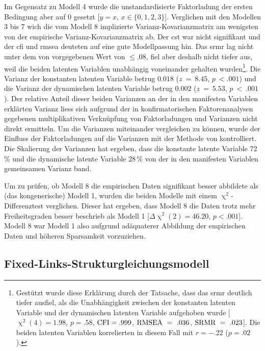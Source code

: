 \documentclass[11pt, twoside, a4paper]{book}		%
\begin{document}
Im Gegensatz zu Modell 4 wurde die unstandardisierte Faktorladung der ersten Bedingung aber auf 0 gesetzt [$y=x,\,x\in\{0, 1, 2, 3\}$].
Verglichen mit den Modellen 3 bis 7 wich die vom Modell 8 implizierte Var\-ianz-Ko\-var\-ianz\-ma\-trix am wenigsten von der empirische Var\-ianz-Ko\-var\-ianz\-ma\-trix ab. Der \gls{cst} war nicht signifikant und der \gls{cfi} und \gls{rmsea} deuteten auf eine gute Modellpassung hin. 
Das \gls{srmr}  lag nicht unter dem von \citet{Hu1999} vorgegebenen Wert von $\leq.08$, fiel aber deshalb  nicht tiefer aus, weil die beiden latenten Variablen unabhängig voneinander gehalten wurden\footnote{Gestützt wurde diese Erklärung durch der Tatsache, dass das \gls{srmr} deutlich tiefer ausfiel, als die Unabhängigkeit zwischen der konstanten latenten Variable und der dynamischen latenten Variable aufgehoben wurde [$\upchi^2(4)=1.98$, $p=.58$, $\textnormal{CFI}=.999$, $\textnormal{RMSEA}~=~.036$, $\textnormal{SRMR}~=~.023$]. Die beiden latenten Variablen korrelierten in diesem Fall mit $r=-.22$ ($p=.02$).}. 
Die Varianz der konstanten latenten Variable betrug $0.018$ ($z~=~8.45$, $p~<.001$) und die Varianz der dynamischen latenten Variable betrug $0.002$ ($z~=~5.53$, $p~<~.001$). 
Der relative Anteil dieser beiden Varianzen an der in den manifesten Variablen erklärten Varianz liess sich aufgrund der in konfirmatorischen Faktorenanalysen gegebenen multiplikativen Verknüpfung von Faktorladungen und Varianzen nicht direkt ermitteln. Um die Varianzen miteinander vergleichen zu können, wurde der Einfluss der Faktorladungen auf die Varianzen mit der Methode von  \citet{Schweizer2011a} kontrolliert. Die Skalierung der Varianzen hat ergeben, dass die konstante latente Variable 72\,\% und die dynamische latente Variable 28\,\% von der in den manifesten Variablen gemeinsamen Varianz band.

Um zu prüfen, ob  Modell 8 die empirischen Daten signifikant besser abbildete als (das kongenerische) Modell 1, wurden die beiden Modelle mit einem $\upchi^2$-Differenztest \citep{Satorra2001} verglichen. Dieser hat ergeben, dass Modell 8 die Daten trotz mehr Freiheitsgraden besser beschrieb als Modell 1 [$\Delta\upchi^2(2)=46.20$, $p<.001$]. Modell 8 war Modell 1 also aufgrund adäquaterer Abbildung der empirischen Daten und höheren Sparsamkeit vorzuziehen.




\subsection{Fixed-Links-Strukturgleichungsmodell}
\end{document}
